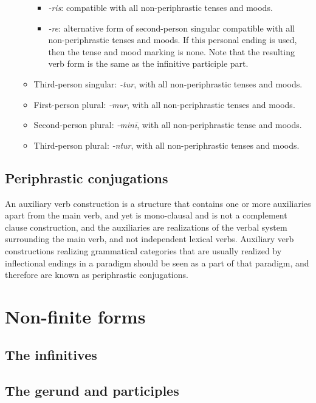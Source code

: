 \documentclass[a4paper, oneside]{report}
\newcommand{\form}[1]{\emph{#1}}
\begin{document}
\begin{itemize}
\begin{itemize}
        \begin{itemize}
            \item \form{-ris}: compatible with all non-periphrastic tenses and moods.
            \item \form{-re}: alternative form of second-person singular compatible 
            with all non-periphrastic tenses and moods.
            If this personal ending is used, then the tense and mood marking is none.
            Note that the resulting verb form is the same as the infinitive participle part.
        \end{itemize}
        \item Third-person singular: \form{-tur}, with all non-periphrastic tenses and moods.
        \item First-person plural: \form{-mur}, with all non-periphrastic tenses and moods.
        \item Second-person plural: \form{-minī}, with all non-periphrastic tense and moods.
        \item Third-person plural: \form{-ntur}, with all non-periphrastic tenses and moods.
    \end{itemize}
\end{itemize}

\subsection{Periphrastic conjugations}

An auxiliary verb construction is a structure 
that contains one or more auxiliaries apart from the main verb, 
and yet is mono-clausal and is not a complement clause construction,
and the auxiliaries are realizations of the verbal system 
surrounding the main verb, and not independent lexical verbs.
Auxiliary verb constructions realizing grammatical categories 
that are usually realized by inflectional endings in a paradigm
should be seen as a part of that paradigm,
and therefore are known as periphrastic conjugations.

\section{Non-finite forms}

\subsection{The infinitives}\label{sec:infinitives}

\subsection{The gerund and participles}\label{sec:nominal-form}
\end{document}
